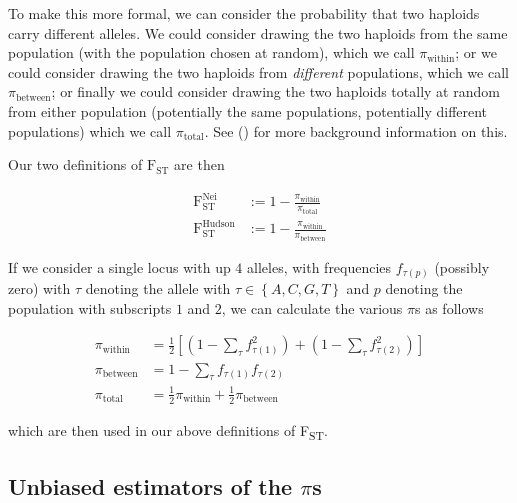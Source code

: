 \documentclass[a4paper,fontsize=9pt,DIV=14]{scrartcl}
\newcommand\citeay[1]{\citeauthor{#1} (\citeyear{#1}) \cite{#1}}
\newcommand{\fst}{F\textsubscript{ST}}
\begin{document}
To make this more formal, we can consider the probability that two haploids carry different alleles.
We could consider drawing the two haploids from the same population (with the population chosen at random), which we call $\pi_\text{within}$; or we could consider drawing the two haploids from \emph{different} populations, which we call $\pi_\text{between}$; or finally we could consider drawing the two haploids totally at random from either population (potentially the same populations, potentially different populations) which we call $\pi_\text{total}$.
See \citeay{Bhatia2013} for more background information on this.

Our two definitions of $\text{F}_\text{ST}$ are then

\begin{align}
    \text{F}_\text{ST}^\text{Nei}    &:= 1 - \frac{\pi_\text{within}}{\pi_\text{total}} \label{eq:popnei}\\
    \text{F}_\text{ST}^\text{Hudson} &:= 1 - \frac{\pi_\text{within}}{\pi_\text{between}} \label{eq:pophudson}
\end{align}

If we consider a single locus with up $4$ alleles, with frequencies $f_{\tau(p)}$ (possibly zero) with  $\tau$ denoting the allele with $\tau \in \left\{A, C, G, T\right\}$ and $p$ denoting the population with subscripts $1$ and $2$, we can calculate the various $\pi$s as follows

\begin{align}
    \label{eq:PiDefs:PiWithin}
    \pi_\text{within} &= \frac{1}{2}\left[\left(1 - \sum_\tau f_{\tau(1)}^2\right) + \left(1 - \sum_\tau f_{\tau(2)}^2\right)\right] \\
    \label{eq:PiDefs:PiBetween}
    \pi_\text{between} &= 1 - \sum_\tau f_{\tau(1)}f_{\tau(2)} \\
    \label{eq:PiDefs:PiTotal}
    \pi_\text{total} &= \frac{1}{2}\pi_\text{within} + \frac{1}{2}\pi_\text{between}
\end{align}

which are then used in our above definitions of \fst.


\subsection{Unbiased estimators of the \texorpdfstring{$\pi$s}{pi's}}
\label{supp:sec:FST:sub:EstimatorsPi}
\end{document}
